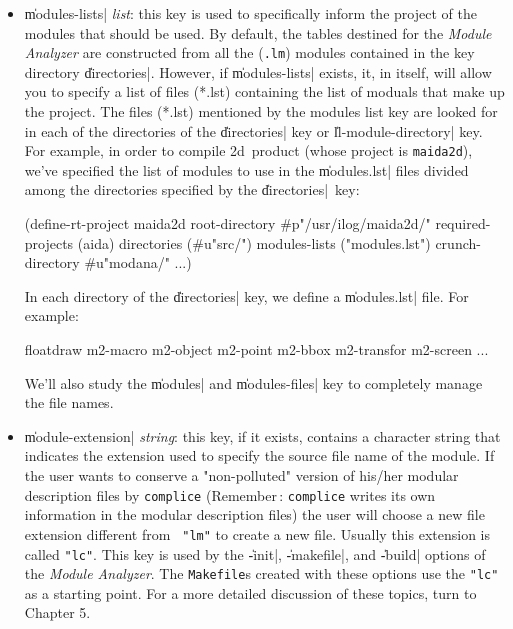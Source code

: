 \begin{itemize}
{\it Note\,:}
You will eventually need to make sure to load the files that define the projects required by \|required-project|.  For example, if you use the \LeLisp\ and \Aida\ librairies:
\begin{Code*}
^L/usr/ilog/lelisp/modana/lisp.prj
^L/usr/ilog/aida/modana/aida.prj

(define-rt-project myproject
 ...
\end{Code*}

\item {\Large \|modules-lists| {\em list}}: this key is used to specifically inform the project of the modules that should be used.  By default, the tables destined for the {\em Module Analyzer} are constructed from all the ({\tt *.lm}) modules contained in the key directory \|directories|.  However, if \|modules-lists| exists, it, in itself, will allow you to specify a list of files (*.lst) containing the list of moduals that make up the project.  The files (*.lst) mentioned by the modules list key are looked for in each of the directories of the \|directories| key or \|ll-module-directory| key. 
For example, in order to compile \Masai2d\ product
(whose project is {\tt maida2d}), 
we've specified the list of modules to use in the \|modules.lst| 
files divided among the directories specified by the \|directories|\ key:

\begin{Code*}
(define-rt-project maida2d
        root-directory #p"/usr/ilog/maida2d/"
        required-projects (aida)  
        directories (#u"src/")
        modules-lists ("modules.lst")
        crunch-directory #u"modana/"
        ...)
\end{Code*}

In each directory of the \|directories| key, we define a
\|modules.lst| file. For example:

\begin{Longcode*}
floatdraw
m2-macro
m2-object
m2-point
m2-bbox
m2-transfor
m2-screen
...
\end{Longcode*}


We'll also study the \|modules| and \|modules-files| key to completely manage the file names.

\item {\Large \|module-extension| {\em string}}: 
this key, if it exists, contains a character string that indicates the extension used to specify the source file name of the module.  If the user wants to conserve a "non-polluted" version of his/her modular description files by {\tt complice}
(Remember\,: {\tt complice} writes its own information in the modular description files)
the user will choose a new file extension different from {\tt
"lm"} to create a new file.  Usually this extension is called {\tt "lc"}.
This key is used by the \|-init|, \|-makefile|, and \|-build| options of the {\em Module Analyzer}.
The {\tt Makefile}s created with these options use the {\tt "lc"} as a starting point.  For a more detailed discussion of these topics, turn to Chapter 5.

\end{itemize}

